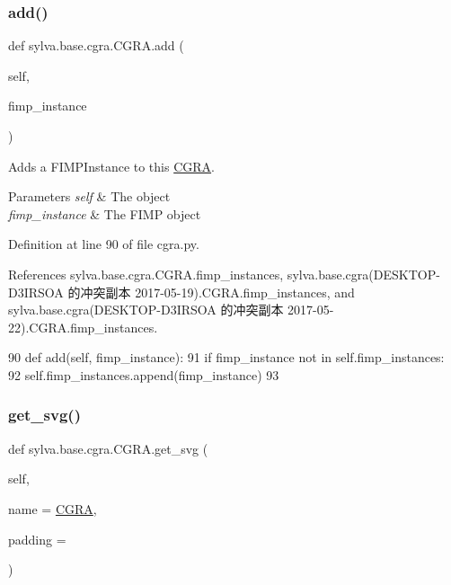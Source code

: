 \subsubsection{\texorpdfstring{add()}{add()}}
{\footnotesize\ttfamily def sylva.\+base.\+cgra.\+C\+G\+R\+A.\+add (\begin{DoxyParamCaption}\item[{}]{self,  }\item[{}]{fimp\+\_\+instance }\end{DoxyParamCaption})}



Adds a F\+I\+M\+P\+Instance to this \hyperlink{classsylva_1_1base_1_1cgra_1_1_c_g_r_a}{C\+G\+RA}. 


\begin{DoxyParams}{Parameters}
{\em self} & The object \\
\hline
{\em fimp\+\_\+instance} & The F\+I\+MP object \\
\hline
\end{DoxyParams}


Definition at line 90 of file cgra.\+py.



References sylva.\+base.\+cgra.\+C\+G\+R\+A.\+fimp\+\_\+instances, sylva.\+base.\+cgra(\+D\+E\+S\+K\+T\+O\+P-\/\+D3\+I\+R\+S\+O\+A 的冲突副本 2017-\/05-\/19).\+C\+G\+R\+A.\+fimp\+\_\+instances, and sylva.\+base.\+cgra(\+D\+E\+S\+K\+T\+O\+P-\/\+D3\+I\+R\+S\+O\+A 的冲突副本 2017-\/05-\/22).\+C\+G\+R\+A.\+fimp\+\_\+instances.


\begin{DoxyCode}
90     \textcolor{keyword}{def }add(self, fimp\_instance):
91         \textcolor{keywordflow}{if} fimp\_instance \textcolor{keywordflow}{not} \textcolor{keywordflow}{in} self.fimp\_instances:
92             self.fimp\_instances.append(fimp\_instance)
93 
\end{DoxyCode}
\mbox{\label{classsylva_1_1base_1_1cgra_1_1_c_g_r_a_a3dbb09fffa43dca0e05704337f93662d}} 
\subsubsection{\texorpdfstring{get\+\_\+svg()}{get\_svg()}}
{\footnotesize\ttfamily def sylva.\+base.\+cgra.\+C\+G\+R\+A.\+get\+\_\+svg (\begin{DoxyParamCaption}\item[{}]{self,  }\item[{}]{name = {\ttfamily \textquotesingle{}\hyperlink{classsylva_1_1base_1_1cgra_1_1_c_g_r_a}{C\+G\+RA}\textquotesingle{}},  }\item[{}]{padding = {} }\end{DoxyParamCaption})}



